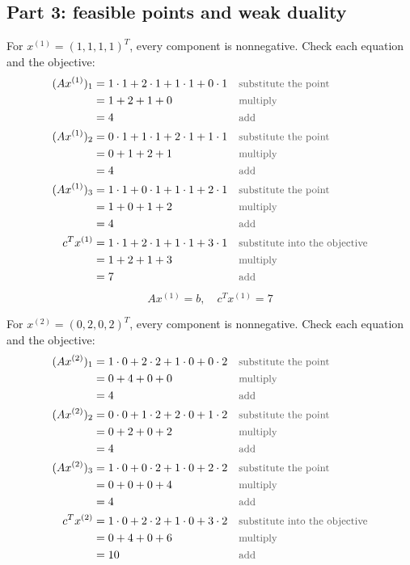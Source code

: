 \documentclass[a4paper,11pt]{article}
\newif\ifexplain
\newcommand{\teil}[1]{\subsection*{#1}}
\newcommand{\why}[1]{\text{\small\color{black!65}#1}}
\newcommand{\explain}[1]{\ifexplain\begin{erklbox}#1\end{erklbox}\fi}
\begin{document}
\teil{Part 3: feasible points and weak duality}
For $x^{(1)}=(1,1,1,1)^T$, every component is nonnegative. Check each equation and the objective:
\begin{align*}
(Ax^{(1)})_1 &= 1\cdot 1 + 2\cdot 1 + 1\cdot 1 + 0\cdot 1 && \why{substitute the point}\\
&= 1 + 2 + 1 + 0 && \why{multiply}\\
&= 4 && \why{add}\\
(Ax^{(1)})_2 &= 0\cdot 1 + 1\cdot 1 + 2\cdot 1 + 1\cdot 1 && \why{substitute the point}\\
&= 0 + 1 + 2 + 1 && \why{multiply}\\
&= 4 && \why{add}\\
(Ax^{(1)})_3 &= 1\cdot 1 + 0\cdot 1 + 1\cdot 1 + 2\cdot 1 && \why{substitute the point}\\
&= 1 + 0 + 1 + 2 && \why{multiply}\\
&= 4 && \why{add}\\
c^Tx^{(1)} &= 1\cdot 1 + 2\cdot 1 + 1\cdot 1 + 3\cdot 1 && \why{substitute into the objective}\\
&= 1 + 2 + 1 + 3 && \why{multiply}\\
&= 7 && \why{add}
\end{align*}
\[\boxed{Ax^{(1)}=b,\quad c^Tx^{(1)}=7}\]
\explain{Jede Zeile muss genau die rechte Seite $4$ treffen. Nichtnegativität allein reicht für die primale Zulässigkeit nicht. Erst nach dieser Probe berechnen wir den Zielfunktionswert.}
For $x^{(2)}=(0,2,0,2)^T$, every component is nonnegative. Check each equation and the objective:
\begin{align*}
(Ax^{(2)})_1 &= 1\cdot 0 + 2\cdot 2 + 1\cdot 0 + 0\cdot 2 && \why{substitute the point}\\
&= 0 + 4 + 0 + 0 && \why{multiply}\\
&= 4 && \why{add}\\
(Ax^{(2)})_2 &= 0\cdot 0 + 1\cdot 2 + 2\cdot 0 + 1\cdot 2 && \why{substitute the point}\\
&= 0 + 2 + 0 + 2 && \why{multiply}\\
&= 4 && \why{add}\\
(Ax^{(2)})_3 &= 1\cdot 0 + 0\cdot 2 + 1\cdot 0 + 2\cdot 2 && \why{substitute the point}\\
&= 0 + 0 + 0 + 4 && \why{multiply}\\
&= 4 && \why{add}\\
c^Tx^{(2)} &= 1\cdot 0 + 2\cdot 2 + 1\cdot 0 + 3\cdot 2 && \why{substitute into the objective}\\
&= 0 + 4 + 0 + 6 && \why{multiply}\\
&= 10 && \why{add}
\end{align*}
\end{document}

